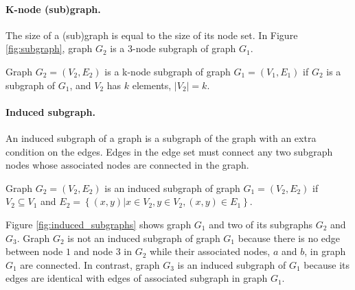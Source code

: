 \paragraph{K-node (sub)graph.}
The size of a (sub)graph is equal to the size of its node set. 
In Figure \ref{fig:subgraph}, graph $G_2$ is a 3-node subgraph of graph $G_1$. 

\begin{definition}
Graph $G_2 = \left( V_2 , E_2 \right)$ is a k-node subgraph of graph $G_1 = \left( V_1, E_1 \right)$ if $G_2$ is a subgraph of $G_1$, and $V_2$ has $k$ elements, $|V_2|=k$. 
\end{definition}

\paragraph{Induced subgraph.} 
An induced subgraph of a graph is a subgraph of the graph with an extra condition on the edges.  
Edges in the edge set must connect any two subgraph nodes whose associated nodes are connected in the graph. 

\begin{definition} 
Graph $G_2 = (V_2, E_2)$ is an induced subgraph of graph $G_1 = (V_2, E_2)$ if $V_2 \subseteq V_1$ and 
$E_2 = \left\{ (x,y)| x \in V_2, y \in V_2, (x,y) \in E_1   \right\}$.
\end{definition}

Figure \ref{fig:induced_subgraphs} shows graph $G_1$ and two of its subgraphs $G_2$ and $G_3$.  
Graph $G_2$ is not an induced subgraph of graph $G_1$ because there is no edge between node $1$ and node $3$ in $G_2$ while their associated nodes, $a$ and $b$, in graph $G_1$ are connected. 
In contrast, graph $G_3$ is an induced subgraph of $G_1$ because its edges are identical with edges of associated subgraph in graph $G_1$. 

